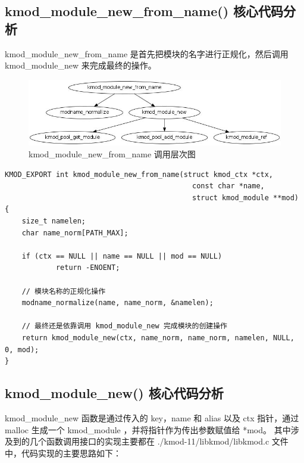 \subsection{kmod\_module\_new\_from\_name() 核心代码分析}

kmod\_module\_new\_from\_name 是首先把模块的名字进行正规化，然后调用
kmod\_module\_new 来完成最终的操作。

\begin{figure}[htbp]
\centering
\includegraphics{./figures/kmod_module_new_from_name.jpg}
\caption{kmod\_module\_new\_from\_name 调用层次图}
\end{figure}

{\begin{shaded}\begin{verbatim}
KMOD_EXPORT int kmod_module_new_from_name(struct kmod_ctx *ctx,
                                            const char *name,
                                            struct kmod_module **mod)
{
    size_t namelen;
    char name_norm[PATH_MAX];

    if (ctx == NULL || name == NULL || mod == NULL)
            return -ENOENT;

    // 模块名称的正规化操作
    modname_normalize(name, name_norm, &namelen);

    // 最终还是依靠调用 kmod_module_new 完成模块的创建操作
    return kmod_module_new(ctx, name_norm, name_norm, namelen, NULL, 0, mod);
}
\end{verbatim}\end{shaded}}
\subsection{kmod\_module\_new() 核心代码分析}

kmod\_module\_new 函数是通过传入的 key，name 和 alias 以及 ctx 指针，通过
malloc 生成一个 kmod\_module ，并将指针作为传出参数赋值给 *mod。
其中涉及到的几个函数调用接口的实现主要都在 ./kmod-11/libkmod/libkmod.c
文件中，代码实现的主要思路如下：

